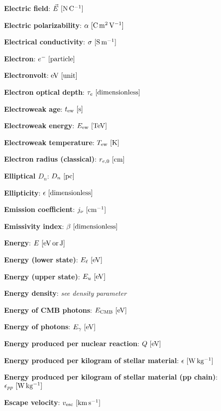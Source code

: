\documentclass[a4paper,10pt]{article}
\begin{document}
{\noindent}\textbf{Electric field}: $\vec{E} ~ [{\rm N\,C^{-1}}]$

{\noindent}\textbf{Electric polarizability}: $\alpha ~ [{\rm C\,m^2\,V^{-1}}]$

{\noindent}\textbf{Electrical conductivity}: $\sigma ~ [{\rm S\,m^{-1}}]$

{\noindent}\textbf{Electron}: $e^- ~ [{\rm particle}]$

{\noindent}\textbf{Electronvolt}: ${\rm eV} ~ [{\rm unit}]$

{\noindent}\textbf{Electron optical depth}: $\tau_e ~ [{\rm dimensionless}]$

{\noindent}\textbf{Electroweak age}: $t_\mathrm{ew} ~ [{\rm s}]$

{\noindent}\textbf{Electroweak energy}: $E_\mathrm{ew} ~ [{\rm TeV}]$

{\noindent}\textbf{Electroweak temperature}: $T_\mathrm{ew} ~ [{\rm K}]$

{\noindent}\textbf{Electron radius (classical)}: $r_{e,0} ~ [{\rm cm}]$

{\noindent}\textbf{Elliptical $D_n$}: $D_n ~ [{\rm pc}]$

{\noindent}\textbf{Ellipticity}: $\epsilon ~ [{\rm dimensionless}]$

{\noindent}\textbf{Emission coefficient}: $j_\nu ~ [{\rm cm^{-1}}]$

{\noindent}\textbf{Emissivity index}: $\beta ~ [{\rm dimensionless}]$

{\noindent}\textbf{Energy}: $E ~ [{\rm eV\,or\,J}]$

{\noindent}\textbf{Energy (lower state)}: $E_\ell ~ [{\rm eV}]$

{\noindent}\textbf{Energy (upper state)}: $E_u ~ [{\rm eV}]$

{\noindent}\textbf{Energy density}: \textit{see density parameter}

{\noindent}\textbf{Energy of CMB photons}: $E_\mathrm{CMB} ~ [{\rm eV}]$

{\noindent}\textbf{Energy of photons}: $E_\gamma ~ [{\rm eV}]$

{\noindent}\textbf{Energy produced per nuclear reaction}: $Q ~ [{\rm eV}]$

{\noindent}\textbf{Energy produced per kilogram of stellar material}: $\epsilon ~ [{\rm W\,kg^{-1}}]$

{\noindent}\textbf{Energy produced per kilogram of stellar material (pp chain)}: $\epsilon_{pp} ~ [{\rm W\,kg^{-1}}]$

{\noindent}\textbf{Escape velocity}: $v_\mathrm{esc} ~ [{\rm km\,s^{-1}}]$
\end{document}
